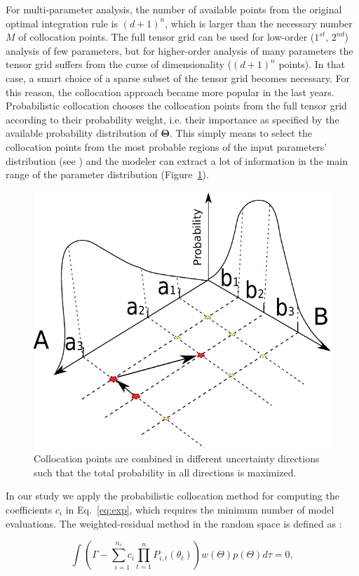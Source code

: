 For multi-parameter analysis, the number of available points from the original
optimal integration rule is $(d+1)^n$, which is larger than the necessary number
$M$ of collocation points. The full tensor grid can be used for low-order
($1^{st}$, $2^{nd}$) analysis of few parameters, but for higher-order analysis
of many parameters the tensor grid suffers from the curse of dimensionality
($(d+1)^n$ points). In that case, a smart choice of a sparse subset of the
tensor grid becomes necessary. For this reason, the collocation approach became
more popular in the last years. Probabilistic collocation \cite{nLi2007,
oladyshkinintegrative,oladyshkin2011concept} chooses the collocation points 
from the full tensor grid according to their probability weight, i.e. their
importance as specified by the available probability distribution of
$\boldsymbol{\Theta}$. This simply means to select the collocation points from
the most probable regions of the input parameters' distribution (see
\cite{oladyshkinintegrative}) and 
the modeler can extract a lot of information in the main range of the parameter
distribution (Figure~\ref{fig:col}).

\begin{figure}
  \centering
  \includegraphics[width=0.65 \linewidth]{./figurer/col} 
  \caption{Collocation points are combined in different uncertainty directions
such that the total probability in all directions is maximized.}
  \label{fig:col}
%
\end{figure}

In our study we apply the probabilistic collocation method for computing the
coefficients $c_{i}$ in Eq.~\ref{eq:exp}, which requires the minimum number of
model evaluations. The weighted-residual method in the random space is defined
as \cite{nLi2007}:

\begin{equation}
\int(\Gamma-\underset{i=1}{\overset{n_c}{\sum}c_{i}}\underset{t=1}{\overset{n}{
\prod}}P_{i,t}(\theta_{t}))w(\Theta)p(\Theta)d\tau=0,\label{eq:residual}
\end{equation}

